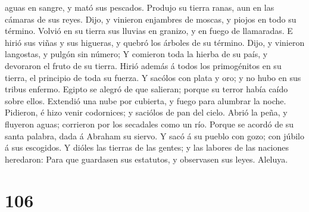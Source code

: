 aguas en sangre, y mató sus pescados.  Produjo su tierra
ranas, aun en las cámaras de sus reyes.  Dijo, y vinieron
enjambres de moscas, y piojos en todo su término.  Volvió
en su tierra sus lluvias en granizo, y en fuego de llamaradas.
 E hirió sus viñas y sus higueras, y quebró los árboles de
su término.  Dijo, y vinieron langostas, y pulgón sin
número;  Y comieron toda la hierba de su país, y devoraron
el fruto de su tierra.  Hirió además á todos los
primogénitos en su tierra, el principio de toda su fuerza. 
Y sacólos con plata y oro; y no hubo en sus tribus enfermo.
 Egipto se alegró de que salieran; porque su terror había
caído sobre ellos.  Extendió una nube por cubierta, y fuego
para alumbrar la noche.  Pidieron, é hizo venir codornices;
y saciólos de pan del cielo.  Abrió la peña, y fluyeron
aguas; corrieron por los secadales como un río.  Porque se
acordó de su santa palabra, dada á Abraham su siervo.  Y
sacó á su pueblo con gozo; con júbilo á sus escogidos.  Y
dióles las tierras de las gentes; y las labores de las naciones
heredaron:  Para que guardasen sus estatutos, y observasen
sus leyes. Aleluya.

\hypertarget{section-105}{%
\section{106}\label{section-105}}

